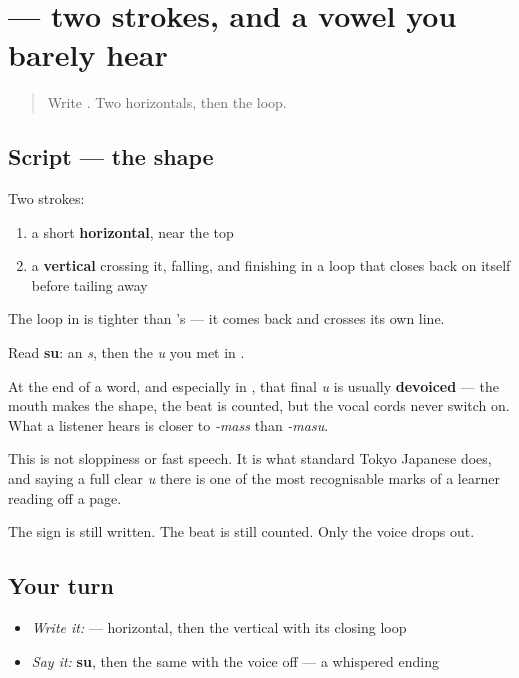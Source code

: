 \section[\texorpdfstring{\ja{す} (su)}{す (su)}]{ — two strokes, and a vowel you barely hear}

\label{lesson:JA-W03-su}



\begin{quote}
Write . Two horizontals, then the loop.
\end{quote}

\subsection*{Script — the shape}

\begin{quote}
\end{quote}

Two strokes:

\begin{enumerate}
\raggedright
  \item a short \textbf{horizontal}, near the top
  \item a \textbf{vertical} crossing it, falling, and finishing in a loop that closes back on itself before tailing away
\end{enumerate}

The loop in  is tighter than 's — it comes back and crosses its own line.

Read \textbf{su}: an \emph{s}, then the \emph{u} you met in .

\begin{culture}
At the end of a word, and especially in \textbf{}, that final \emph{u} is usually \textbf{devoiced} — the mouth makes the shape, the beat is counted, but the vocal cords never switch on. What a listener hears is closer to \emph{-mass} than \emph{-masu}.

This is not sloppiness or fast speech. It is what standard Tokyo Japanese does, and saying a full clear \emph{u} there is one of the most recognisable marks of a learner reading off a page.

The sign is still written. The beat is still counted. Only the voice drops out.
\end{culture}

\subsection*{Your turn}
\begin{itemize}
\raggedright
  \item \emph{Write it:}  — horizontal, then the vertical with its closing loop
  \item \emph{Say it:} \textbf{su}, then the same with the voice off — a whispered ending
\end{itemize}


